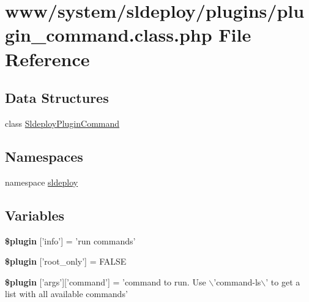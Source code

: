 \hypertarget{plugin__command_8class_8php}{
\section{www/system/sldeploy/plugins/plugin\_\-command.class.php File Reference}
\label{plugin__command_8class_8php}
}
\subsection*{Data Structures}
\begin{DoxyCompactItemize}
\item 
class \hyperlink{class_sldeploy_plugin_command}{SldeployPluginCommand}
\end{DoxyCompactItemize}
\subsection*{Namespaces}
\begin{DoxyCompactItemize}
\item 
namespace \hyperlink{namespacesldeploy}{sldeploy}
\end{DoxyCompactItemize}
\subsection*{Variables}
\begin{DoxyCompactItemize}
\item 
\hypertarget{plugin__command_8class_8php_a95edf69ebbeaeedb03bab3bb010f2af9}{
{\bfseries \$plugin} \mbox{[}'info'\mbox{]} = 'run commands'}
\label{plugin__command_8class_8php_a95edf69ebbeaeedb03bab3bb010f2af9}

\item 
\hypertarget{plugin__command_8class_8php_a1d302084fa15e3efe6c843cbb5096985}{
{\bfseries \$plugin} \mbox{[}'root\_\-only'\mbox{]} = FALSE}
\label{plugin__command_8class_8php_a1d302084fa15e3efe6c843cbb5096985}

\item 
\hypertarget{plugin__command_8class_8php_adac04c88af771b0cbb84648e85fca4ea}{
{\bfseries \$plugin} \mbox{[}'args'\mbox{]}\mbox{[}'command'\mbox{]} = 'command to run. Use $\backslash$'command-\/ls$\backslash$' to get a list with all available commands'}
\label{plugin__command_8class_8php_adac04c88af771b0cbb84648e85fca4ea}

\end{DoxyCompactItemize}


